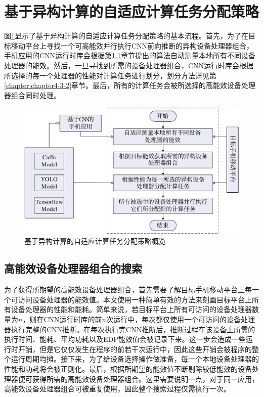 \section{基于异构计算的自适应计算任务分配策略}

图\ref{figure:figure29}显示了基于异构计算的自适应计算任务分配策略的基本流程。首先，为了在目标移动平台上寻找一个可高能效并行执行CNN前向推断的异构设备处理器组合，手机应用的CNN运行时库会根据第\ref{chapter:chapter4-3-1}章节提出的算法自动测量本地所有不同设备处理器的能效。然后，一旦寻找到所需的设备处理器组合，CNN运行时库会根据所选择的每一个处理器的性能对计算任务进行划分，划分方法详见第\ref{chapter:chapter4-3-2}章节。最后，所有的计算任务会被所选择的高能效设备处理器组合同时处理。

\begin{figure}[htbp]
    \centering
    \includegraphics[height=0.4\textwidth]{figures/strategy_overview.pdf}
    \caption{基于异构计算的自适应计算任务分配策略概览}\label{figure:figure29}
\end{figure}

\subsection{高能效设备处理器组合的搜索}
\label{chapter:chapter4-3-1}

为了获得所期望的高能效设备处理器组合，首先需要了解目标手机移动平台上每一个可访问设备处理器的能效值。本文使用一种简单有效的方法来刻画目标平台上所有设备处理器的性能和能耗。简单来说，若目标平台上所有可访问的设备处理器数量为$n$，则在CNN运行时库的前$n$次运行中，每次都仅使用一个可访问的设备处理器执行完整的CNN推断。在每次执行完CNN推断后，推断过程在该设备上所需的执行时间、能耗、平均功耗以及EDP能效值会被记录下来。这一步会造成一些运行时开销，但是它仅仅发生在程序的前若干次运行中，因此这些开销会被程序的整个运行周期均摊。接下来，为了给设备选择操作做准备，每一个本地设备处理器的性能和功耗将会被正则化。最后，根据所期望的能效值不断剔除较低能效的设备处理器便可获得所需的高能效设备处理器组合。这里需要说明一点，对于同一应用，高能效设备处理器组合可被重复使用，因此整个搜索过程仅需执行一次。

